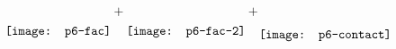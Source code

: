 \documentclass{standalone}
\begin{document}
$
\raisebox{-5.5mm}{\texttt{[image: p6-fac]}}+\raisebox{-5.5mm}{\texttt{[image: p6-fac-2]}}+\hspace*{-0.05cm}\raisebox{-6.5mm}{\texttt{[image: p6-contact]}}
$
\end{document}
